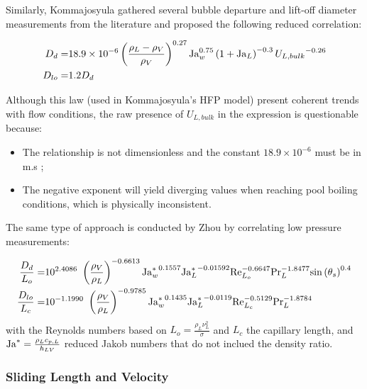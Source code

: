 Similarly, Kommajosyula gathered several bubble departure and lift-off diameter measurements from the literature and proposed the following reduced correlation:

\begin{align}
D_{d} =& 18.9 \times 10^{-6} \left( \frac{\rho_{L}-\rho_{V}}{\rho_{V}} \right)^{0.27} \mathrm{Ja}_{w}^{0.75} \left( 1+\mathrm{Ja}_{L} \right)^{-0.3} {U_{L,bulk}}^{-0.26}
\label{eq:dd_komma} \\
D_{lo} =& 1.2 D_{d}
\label{eq:dlo_komma}
\end{align}

\begin{remark*}{}
Although this law (used in Kommajosyula's HFP model) present coherent trends with flow conditions, the raw presence of $U_{L,bulk}$ in the expression is questionable because:

\begin{itemize}
\item The relationship is not dimensionless and the constant $18.9 \times 10^{-6}$ must be in m.s ;
\item The negative exponent will yield diverging values when reaching pool boiling conditions, which is physically inconsistent.
\end{itemize}
\end{remark*}

\npar

The same type of approach is conducted by Zhou \etal \cite{zhou_mechanistic_2021} by correlating low pressure measurements:

\begin{align}
\frac{D_{d}}{L_{o}} =& 10^{2.4086}\ \parth{\frac{\rho_{V}}{\rho_{L}}}^{-0.6613} {\Ja^{*}_{w}}^{0.1557} {\Ja^{*}_{L}}^{-0.01592} \Re_{L_{o}}^{-0.6647} \Pr_{L}^{-1.8477} \sin{\theta_{s}}^{0.4}
\label{eq:dd_zhou}
\\
%
\frac{D_{lo}}{L_{c}} =& 10^{-1.1990}\ \parth{\frac{\rho_{V}}{\rho_{L}}}^{-0.9785} {\Ja^{*}_{w}}^{0.1435} {\Ja^{*}_{L}}^{-0.0119} \Re_{L_{c}}^{-0.5129} \Pr_{L}^{-1.8784}
\label{eq:dlo_zhou}
\end{align}
with the Reynolds numbers based on $L_{o} = \frac{\rho_{L}\nu_{L}^{2}}{\sigma}$ and $L_{c}$ the capillary length, and $\mathrm{Ja}^{*} = \frac{\rho_{L}c_{p,L}}{h_{LV}}$ reduced Jakob numbers that do not inclued the density ratio. 


\subsubsection{Sliding Length and Velocity}

